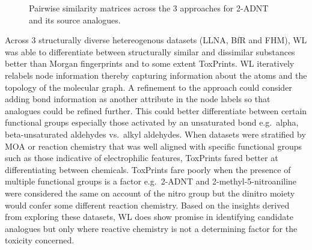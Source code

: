 \documentclass[
  super,
  preprint,
  3p]{elsarticle}
\begin{document}
\begin{figure}


\caption{\label{fig-pprtv}Pairwise similarity matrices across the 3
approaches for 2-ADNT and its source analogues.}

\end{figure}%

Across 3 structurally diverse hetereogenous datasets (LLNA, BfR and
FHM), WL was able to differentiate between structurally similar and
dissimilar substances better than Morgan fingerprints and to some extent
ToxPrints. WL iteratively relabels node information thereby capturing
information about the atoms and the topology of the molecular graph. A
refinement to the approach could consider adding bond information as
another attribute in the node labels so that analogues could be refined
further. This could better differentiate between certain functional
groups especially those activated by an unsaturated bond e.g.~alpha,
beta-unsaturated aldehydes vs.~alkyl aldehydes. When datasets were
stratified by MOA or reaction chemistry that was well aligned with
specific functional groups such as those indicative of electrophilic
features, ToxPrints fared better at differentiating between chemicals.
ToxPrints fare poorly when the presence of multiple functional groups is
a factor e.g.~2-ADNT and 2-methyl-5-nitroaniline were considered the
same on account of the nitro group but the dinitro moiety would confer
some different reaction chemistry. Based on the insights derived from
exploring these datasets, WL does show promise in identifying candidate
analogues but only where reactive chemistry is not a determining factor
for the toxicity concerned.
\end{document}
